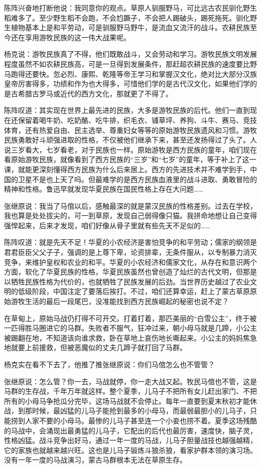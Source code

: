 \par 陈阵兴奋地打断他说：我同意你的观点。草原人驯服野马，可比远古农民驯化野生稻难多了。至少野生稻不会跑，不会尥蹶子，不会把人踢破头，踢死拖死。驯化野生植物基本上是和平劳动，可是驯服野马野牛，是流血又流汗的战斗。农耕民族至今还在享用游牧民族的这一伟大战果呢。
\par 杨克说：游牧民族真了不得，他们既敢战斗，又会劳动和学习。游牧民族文明发展程度虽然不如农耕民族高，可是一旦得到发展条件，那赶超农耕民族的速度要比野马跑得还要快。忽必烈、康熙、乾隆等帝王学习和掌握汉文化，绝对比大部分汉族皇帝厉害得多，功绩和作为也大得多，可惜他们学的是古代汉文化，如果他们学的是古希腊古罗马或近代的西方文化，那就更了不得了。
\par 陈阵叹道：其实现在世界上最先进的民族，大多是游牧民族的后代。他们一直到现在还保留着喝牛奶、吃奶酪、吃牛排，织毛衣、铺草坪、养狗、斗牛、赛马、竞技体育，还有热爱自由、民主选举、尊重妇女等等的原始游牧民族遗风和习惯。游牧民族勇敢好斗顽强进取的性格，不仅被他们继承下来，甚至还发扬得过了头了。人说三岁看大，七岁看老，对于民族也一样。原始游牧是西方民族的童年，咱们现在看原始游牧民族，就像看到了西方民族的“三岁”和“七岁”的童年，等于补上了这一课，就能更深刻懂得西方民族为什么后来居上。西方的先进技术并不难学到手，中国的卫星不是也上天了吗。但最难学的是西方民族血液里的战斗进取、勇敢冒险的精神和性格。鲁迅早就发现华夏民族在国民性格上存在大问题……
\par 张继原说：我当了马倌以后，感触最深的就是蒙汉民族的性格差别。过去在学校，我也算是处处拔尖的，可一到草原，发现自己弱得像只猫。我拼命地想让自己变得强悍起来，后来才发现，咱们好像从骨子里就有些先天不足似的……
\par 陈阵叹道：就是先天不足！华夏的小农经济是害怕竞争的和平劳动；儒家的纲领是君君臣臣父父子子，强调的是上尊下卑，论资排辈，无条件服从，以专制暴力消灭竞争，来维护皇权和农业的和平。华夏的小农经济和儒家文化，从存在和意识两个方面，软化了华夏民族的性格，华夏民族虽然也曾创造了灿烂的古代文明，但那是以牺牲民族性格为代价的，也就牺牲了民族发展的后劲。当世界历史越过了农业文明的低级阶段，中国注定了要落后挨打。不过，咱们还算幸运，赶上了蒙古草原原始游牧生活的最后一段尾巴，没准能找到西方民族崛起的秘密也说不定？
\par 在草甸上，原始马战仍打得不可开交。打着打着，那匹美丽的“白雪公主”，终于被一匹得胜马圈进它的马群。失败者不服气，狂冲过来，朝小母马就是几蹄，小公主被踢翻在地，不知道该向谁求救，卧在草地上哀伤地长嘶起来。小公主的妈妈焦急地就要上前援救，但被恶魔似的丈夫几蹄子就打回了马群。
\par 杨克实在看不下去了，他推了推张继原说：你们马倌怎么也不管管？
\par 张继原说：怎么管？你一去，马战就停，你一走大战又起。牧民马倌也不管，这是马群的生存战，千年万年就这样。整个夏季，儿马子不把所有女儿赶出家门、不把所有的小母马争抢瓜分完毕，这场马战就不会停止。每年一直要到夏末秋初才能休战，到那时候，最凶猛的儿马子能抢到最多的小母马，而最弱最胆小的儿马子，只能捞到人家不要的小母马。最惨的儿马子甚至连一个小妾也捞不着。夏季这场残酷的马战中，会涌现出最勇猛的儿马子，它配出的后代也最厉害，速度快，脑子灵，性格凶猛。战斗竞争出好马，通过一年一度的马战，儿马子胆量战技也越强越精，它的家族也就越来越兴旺。这也是儿马子锻炼斗狼杀狼，看家护群本领的演习场。没有一年一度的马战演习，蒙古马群根本无法在草原生存。
